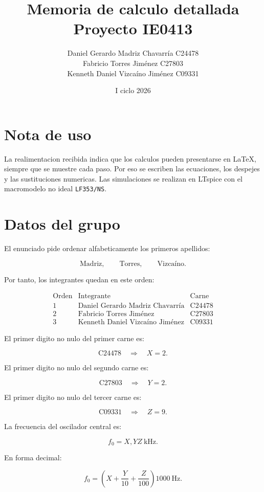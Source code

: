 \documentclass[11pt,letterpaper]{article}
\title{Memoria de calculo detallada\\Proyecto IE0413}
\author{Daniel Gerardo Madriz Chavarr\'ia C24478\\
Fabricio Torres Jim\'enez C27803\\
Kenneth Daniel Vizca\'ino Jim\'enez C09331}
\date{I ciclo 2026}
\begin{document}
\maketitle

\section*{Nota de uso}

La realimentacion recibida indica que los calculos pueden presentarse en
\LaTeX, siempre que se muestre cada paso. Por eso se escriben las ecuaciones,
los despejes y las sustituciones numericas. Las simulaciones se realizan en
LTspice con el macromodelo no ideal \texttt{LF353/NS}.

\section{Datos del grupo}

El enunciado pide ordenar alfabeticamente los primeros apellidos:

\[
\text{Madriz}, \qquad \text{Torres}, \qquad \text{Vizca\'ino}.
\]

Por tanto, los integrantes quedan en este orden:

\[
\begin{array}{c|c|c}
\text{Orden} & \text{Integrante} & \text{Carne} \\
\hline
1 & \text{Daniel Gerardo Madriz Chavarr\'ia} & \text{C24478} \\
2 & \text{Fabricio Torres Jim\'enez} & \text{C27803} \\
3 & \text{Kenneth Daniel Vizca\'ino Jim\'enez} & \text{C09331}
\end{array}
\]

El primer digito no nulo del primer carne es:

\[
\text{C24478}\quad \Rightarrow \quad X=2.
\]

El primer digito no nulo del segundo carne es:

\[
\text{C27803}\quad \Rightarrow \quad Y=2.
\]

El primer digito no nulo del tercer carne es:

\[
\text{C09331}\quad \Rightarrow \quad Z=9.
\]

La frecuencia del oscilador central es:

\[
f_0=X,YZ~\text{kHz}.
\]

En forma decimal:

\[
f_0=
\left(
X+\frac{Y}{10}+\frac{Z}{100}
\right)1000~\text{Hz}.
\]
\end{document}

